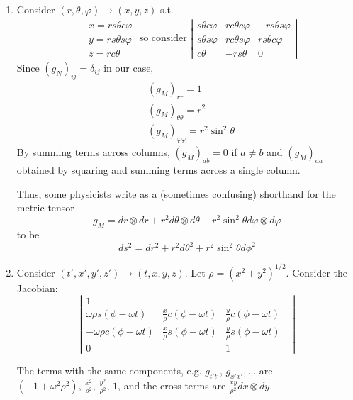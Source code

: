 \begin{enumerate}
	\item[(a)] Consider $(r,\theta, \varphi) \to (x,y,z)$ s.t. 
	\[
	\begin{gathered}
	\begin{aligned}
		& x = rs{\theta} c{\varphi} \\
		& y = rs{\theta} s{\varphi} \\
		& z = rc{\theta}
	\end{aligned}
\text{ so consider } \left| \begin{matrix} s{\theta} c{\varphi} & rc{\theta} c{\varphi} & - rs{\theta} s{\varphi} \\
	s{\theta} s{\varphi} & rc{\theta} s{\varphi} & rs{\theta} c{\varphi} \\
	c{\theta} & -rs{\theta} & 0 \end{matrix} \right|
	\end{gathered}
	\]
	Since $(g_N)_{ij} = \delta_{ij}$ in our case,
	\[
	\begin{aligned}
		& (g_M)_{rr} = 1 \\
		& (g_M)_{\theta \theta} = r^2 \\
		& (g_M)_{\varphi \varphi} = r^2 \sin^2{\theta}
	\end{aligned}
	\]
	By summing terms across columns, $(g_M)_{ab} =0$ if $a\neq b$ and $(g_M)_{aa}$ obtained by squaring and summing terms across a single column.

	Thus, some physicists write as a (sometimes confusing) shorthand for the metric tensor
	\[
	g_M = dr \otimes dr + r^2 d\theta \otimes d\theta + r^2 \sin^2{\theta} d\varphi \otimes d\varphi
	\]
	to be
	\[
	ds^2 = dr^2 + r^2 d\theta^2 + r^2 \sin^2{\theta} d\phi^2	
	\]
	\item[(b)] Consider $(t', x', y', z') \to (t, x, y, z)$. Let $\rho = (x^2 + y^2)^{1/2}$. Consider the Jacobian:
	\[
	\left| \begin{matrix} 1 & & & \\ 
		\omega \rho s(\phi - \omega t) & \frac{x}{\rho} c(\phi - \omega t) &  \frac{y}{\rho} c(\phi - \omega t) & \\
		 -\omega \rho  c(\phi - \omega t) &  \frac{x}{\rho} s(\phi - \omega t) &  \frac{y}{\rho} s(\phi - \omega t) & \\
		 0 & & 1 \end{matrix} \right|
	\]

The terms with the same components, e.g. $g_{t't'}, \, g_{x'x'}, \dots$ are $(-1 + \omega^2 \rho^2), \, \frac{x^2}{\rho^2} , \, \frac{y^2}{\rho^2}, \, 1$, and the cross terms are $\frac{xy}{\rho^2} dx \otimes dy$.
\end{enumerate}


